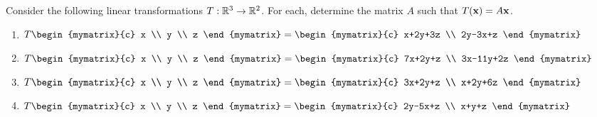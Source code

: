 \begin{ex}
  Consider the following linear transformations
  $T:\mathbb{R}^{3}\rightarrow \mathbb{R}^{2}$.  For each, determine the matrix $A$
  such that $T(\mbox{\bf x})=A\mbox{\bf x}$.
  \begin{enumerate}
  \item $T\begin{mymatrix}{c}
      x \\
      y \\
      z
    \end{mymatrix} =\begin{mymatrix}{c}
      x+2y+3z \\
      2y-3x+z
    \end{mymatrix} $

  \item $T\begin{mymatrix}{c}
      x \\
      y \\
      z
    \end{mymatrix} =\begin{mymatrix}{c}
      7x+2y+z \\
      3x-11y+2z
    \end{mymatrix} $

  \item $T\begin{mymatrix}{c}
      x \\
      y \\
      z
    \end{mymatrix} =\begin{mymatrix}{c}
      3x+2y+z \\
      x+2y+6z
    \end{mymatrix} $

  \item $T\begin{mymatrix}{c}
      x \\
      y \\
      z
    \end{mymatrix} =\begin{mymatrix}{c}
      2y-5x+z \\
      x+y+z
    \end{mymatrix} $
  \end{enumerate}
\end{ex}

